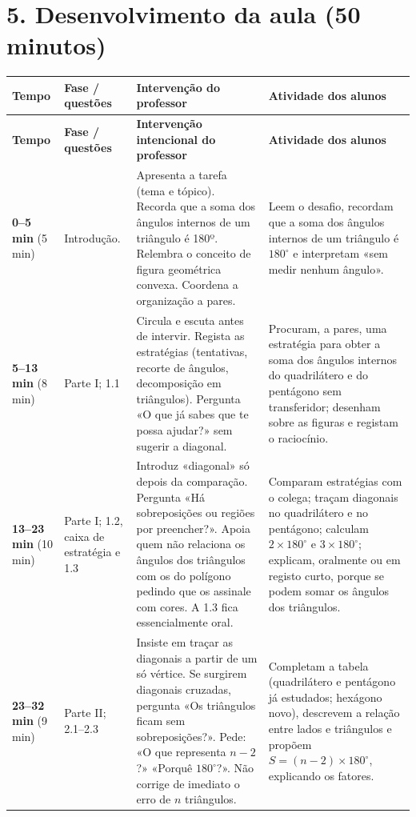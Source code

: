 \section*{5. Desenvolvimento da aula (50 minutos)}
\begingroup\small
\renewcommand{\arraystretch}{1.24}
\begin{longtable}{|p{1.35cm}|p{2.25cm}|p{5.55cm}|p{5.1cm}|}
\hline
\rowcolor{azulClaro}\textbf{Tempo}&\textbf{Fase / questões}&\textbf{Intervenção do professor}&\textbf{Atividade dos alunos}\\\hline
\endfirsthead
\hline\rowcolor{azulClaro}\textbf{Tempo}&\textbf{Fase / questões}&\textbf{Intervenção intencional do professor}&\textbf{Atividade dos alunos}\\\hline
\endhead
\textbf{0--5 min} (5 min)&Introdução. &
Apresenta a tarefa (tema e tópico). Recorda que a soma dos ângulos internos de um triângulo é 180º. Relembra o conceito de figura geométrica convexa. Coordena a organização a pares. &Leem o desafio, recordam que a soma dos ângulos internos de um triângulo é $180^\circ$ e interpretam «sem medir nenhum ângulo».\\\hline
\textbf{5--13 min} (8 min)&Parte I; 1.1&Circula e escuta antes de intervir. Regista as estratégias (tentativas, recorte de ângulos, decomposição em triângulos). Pergunta «O que já sabes que te possa ajudar?» sem sugerir a diagonal.&Procuram, a pares, uma estratégia para obter a soma dos ângulos internos do quadrilátero e do pentágono sem transferidor; desenham sobre as figuras e registam o raciocínio.\\\hline
\textbf{13--23 min} (10 min)&Parte I; 1.2, caixa de estratégia e 1.3&Introduz «diagonal» só depois da comparação. Pergunta «Há sobreposições ou regiões por preencher?». Apoia quem não relaciona os ângulos dos triângulos com os do polígono pedindo que os assinale com cores. A 1.3 fica essencialmente oral.&Comparam estratégias com o colega; traçam diagonais no quadrilátero e no pentágono; calculam $2\times180^\circ$ e $3\times180^\circ$; explicam, oralmente ou em registo curto, porque se podem somar os ângulos dos triângulos.\\\hline
\textbf{23--32 min} (9 min)&Parte II; 2.1--2.3&Insiste em traçar as diagonais a partir de um só vértice. Se surgirem diagonais cruzadas, pergunta «Os triângulos ficam sem sobreposições?». Pede: «O que representa $n-2$?» «Porquê $180^\circ$?». Não corrige de imediato o erro de $n$ triângulos.&Completam a tabela (quadrilátero e pentágono já estudados; hexágono novo), descrevem a relação entre lados e triângulos e propõem $S=(n-2)\times180^\circ$, explicando os fatores.\\\hline

\end{longtable}
